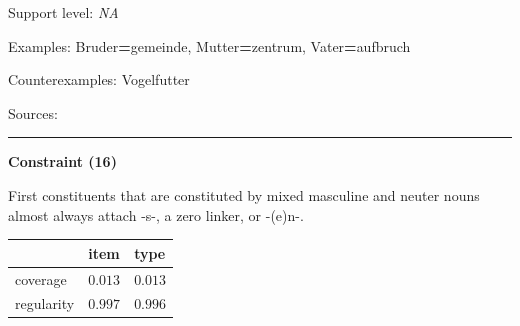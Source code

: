 \vspace{-1.35em}

\noindent
Support level: \textit{NA}

\vspace{0.3em}

\noindent
Examples: Bruder\textbf{=}gemeinde, Mutter\textbf{=}zentrum, Vater\textbf{=}aufbruch

\noindent
Counterexamples: Vogel{\zeroLinker}futter

\vspace{0.3em}

\noindent
Sources: \citet[29]{schaefer_pankratz_2018}

\vspace{0.35em}
\hrule




\vspace{0.4em}

\begin{center}
\textbf{Constraint (16)}
\end{center}

\noindent
First constituents that are constituted by mixed masculine and neuter nouns almost always attach -s-, a zero linker, or -(e)n-.
\vspace{0.5em}


\vspace{-0.25em}

\begin{table}[!ht]
\begin{center}
\setlength{\extrarowheight}{1pt}
\begin{tabularx}{\columnwidth}{|X|X|X|}
\hline
 & item & type \\
\hline
 coverage & $0.013$ & $0.013$ \\
\hline
 regularity & $0.997$ & $0.996$ \\
\hline
\end{tabularx}
\end{center}
\end{table}

